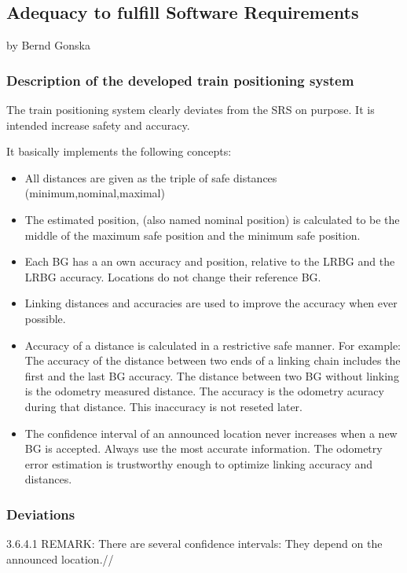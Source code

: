 \subsection{Adequacy to fulfill Software Requirements}
by Bernd Gonska

\subsubsection{Description of the developed train positioning system}
The train positioning system clearly deviates from the SRS on purpose. It is intended increase safety and accuracy.

It basically implements the following concepts:
\begin{itemize}
\item All distances are given as the triple of safe distances (minimum,nominal,maximal)

\item The estimated position, (also named nominal position) is calculated to be the middle of the maximum safe position and the minimum safe position.

\item Each BG has a an own accuracy and position, relative to the LRBG and the LRBG accuracy. Locations do not change their reference BG.
  
\item Linking distances and accuracies are used to improve the accuracy when ever possible.

\item Accuracy of a distance is calculated in a restrictive safe manner. For example: The accuracy of the distance between two ends of a linking chain includes the first and the last BG accuracy. The distance between two BG without linking is the odometry measured distance. The accuracy is the odometry acuracy during that distance. This inaccuracy is not reseted later.

\item The confidence interval of an announced location never increases when a new BG is accepted. Always use the most accurate information. The odometry error estimation is trustworthy enough to optimize linking accuracy and distances.
\end{itemize}

\subsubsection{Deviations}
3.6.4.1 REMARK: There are several confidence intervals: They depend on the announced location.//

